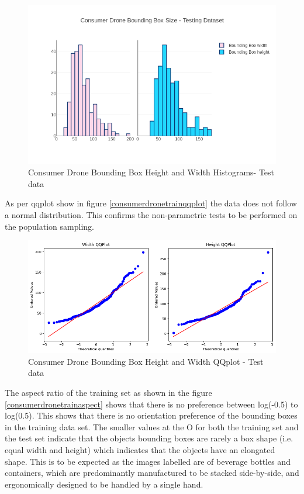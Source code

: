 \documentclass{article}
\begin{document}
\begin{figure}[h]
\centering
\label{consumerdronetesthist}
\includegraphics[scale=0.4]{images/test-histogram.png}
\caption{Consumer Drone Bounding Box Height and Width Histograms- Test data}
\end{figure}

As per qqplot show in figure \ref{consumerdronetrainqqplot} the data does not follow a normal distribution. This confirms the non-parametric tests to be performed on the population sampling.

\begin{figure}[h]
\centering
\label{consumerdronetestqqplot}
\includegraphics[scale=0.4]{images/test-qqplot.png}
\caption{Consumer Drone Bounding Box Height and Width QQplot - Test data}
\end{figure}

The aspect ratio of the training set as shown in the figure \ref{consumerdronetrainaspect} shows that there is no preference between log(-0.5) to log(0.5). This shows that there is no orientation preference of the bounding boxes in the training data set. The smaller values at the O for both the training set and the test set indicate that the objects bounding boxes are rarely a box shape (i.e. equal width and height) which indicates that the objects have an elongated shape. This is to be expected as the images labelled are of beverage bottles and containers, which are predominantly manufactured to be stacked side-by-side, and ergonomically designed to be handled by a single hand.
\end{document}
